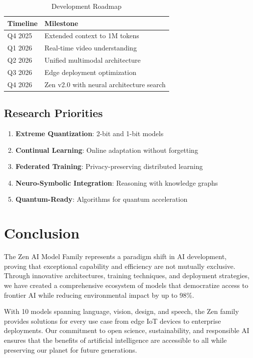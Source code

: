 \documentclass[11pt,a4paper]{article}
\begin{document}
\begin{table}[H]
\centering
\begin{tabular}{ll}
\toprule
\textbf{Timeline} & \textbf{Milestone} \\
\midrule
Q4 2025 & Extended context to 1M tokens \\
Q1 2026 & Real-time video understanding \\
Q2 2026 & Unified multimodal architecture \\
Q3 2026 & Edge deployment optimization \\
Q4 2026 & Zen v2.0 with neural architecture search \\
\bottomrule
\end{tabular}
\caption{Development Roadmap}
\end{table}

\subsection{Research Priorities}

\begin{enumerate}
    \item \textbf{Extreme Quantization}: 2-bit and 1-bit models
    \item \textbf{Continual Learning}: Online adaptation without forgetting
    \item \textbf{Federated Training}: Privacy-preserving distributed learning
    \item \textbf{Neuro-Symbolic Integration}: Reasoning with knowledge graphs
    \item \textbf{Quantum-Ready}: Algorithms for quantum acceleration
\end{enumerate}

\section{Conclusion}

The Zen AI Model Family represents a paradigm shift in AI development, proving that exceptional capability and 
efficiency are not mutually exclusive. Through innovative architectures, training techniques, and deployment 
strategies, we have created a comprehensive ecosystem of models that democratize access to frontier AI while 
reducing environmental impact by up to 98\%.

With 10 models spanning language, vision, design, and speech, the Zen family provides solutions for every use 
case from edge IoT devices to enterprise deployments. Our commitment to open science, sustainability, and 
responsible AI ensures that the benefits of artificial intelligence are accessible to all while preserving 
our planet for future generations.
\end{document}
